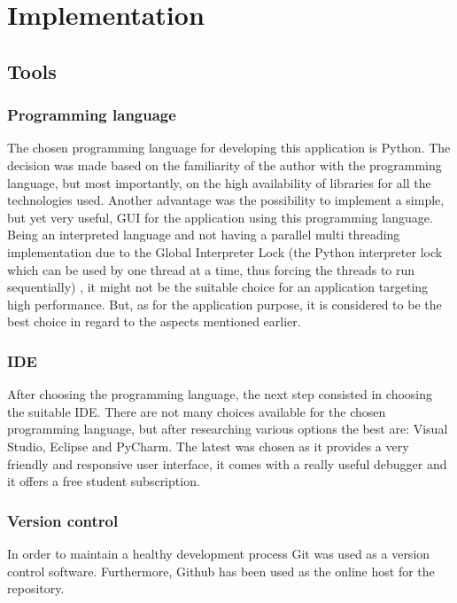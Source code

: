 \documentclass[12pt]{report}
\begin{document}
\chapter{Implementation}

\section{Tools}

\subsection{Programming language}

The chosen programming language for developing this application is Python. The decision was made based on the familiarity of the author with the programming language, but most importantly, on the high availability of libraries for all the technologies used. Another advantage was the possibility to implement a simple, but yet very useful, GUI for the application using this programming language. Being an interpreted language and not having a parallel multi threading implementation due to the Global Interpreter Lock (the Python interpreter lock which can be used by one thread at a time, thus forcing the threads to run sequentially) \cite{python}, it might not be the suitable choice for an application targeting high performance. But, as for the application purpose, it is considered to be the best choice in regard to the aspects mentioned earlier.

\subsection{IDE}

After choosing the programming language, the next step consisted in choosing the suitable IDE. There are not many choices available for the chosen programming language, but after researching various options the best are: Visual Studio, Eclipse and PyCharm. The latest was chosen as it provides a very friendly and responsive user interface, it comes with a really useful debugger and it offers a free student subscription.

\subsection{Version control}

In order to maintain a healthy development process Git was used as a version control software. Furthermore, Github has been used as the online host for the repository.
\end{document}
